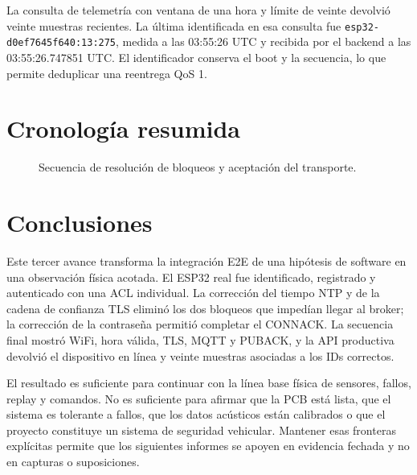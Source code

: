 \documentclass[10pt,a4paper]{article}
\newcommand{\code}[1]{\texttt{\small #1}}
\begin{document}
La consulta de telemetría con ventana de una hora y límite de veinte devolvió
veinte muestras recientes. La última identificada en esa consulta fue
\code{esp32-d0ef7645f640:13:275}, medida a las 03:55:26 UTC y recibida por el
backend a las 03:55:26.747851 UTC. El identificador conserva el boot y la
secuencia, lo que permite deduplicar una reentrega QoS 1.

\section{Cronología resumida}

\begin{figure}[htbp]
\centering
{}
\caption{Secuencia de resolución de bloqueos y aceptación del transporte.}
\label{fig:timeline}
\end{figure}

\clearpage
\section{Conclusiones}

Este tercer avance transforma la integración E2E de una hipótesis de software
en una observación física acotada. El ESP32 real fue identificado, registrado y
autenticado con una ACL individual. La corrección del tiempo NTP y de la cadena
de confianza TLS eliminó los dos bloqueos que impedían llegar al broker; la
corrección de la contraseña permitió completar el CONNACK. La secuencia final
mostró WiFi, hora válida, TLS, MQTT y PUBACK, y la API productiva devolvió el
dispositivo en línea y veinte muestras asociadas a los IDs correctos.

El resultado es suficiente para continuar con la línea base física de sensores,
fallos, replay y comandos. No es suficiente para afirmar que la PCB está lista,
que el sistema es tolerante a fallos, que los datos acústicos están calibrados o
que el proyecto constituye un sistema de seguridad vehicular. Mantener esas
fronteras explícitas permite que los siguientes informes se apoyen en evidencia
fechada y no en capturas o suposiciones.
\end{document}
